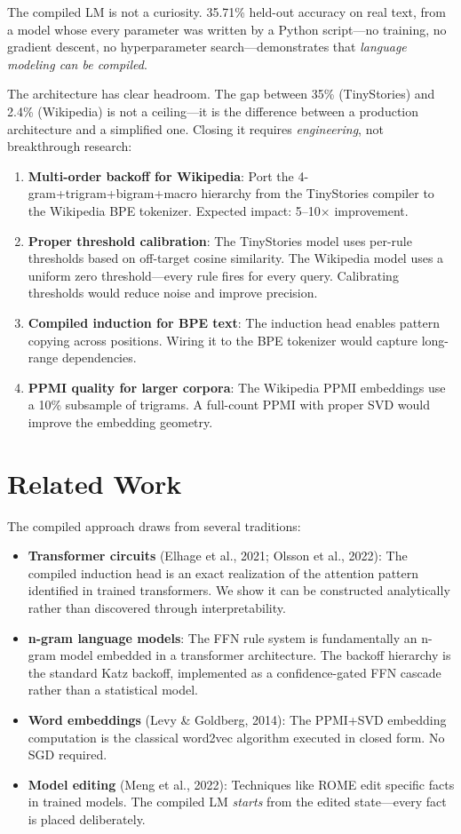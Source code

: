\documentclass[11pt,a4paper]{article}
\begin{document}
The compiled LM is not a curiosity. 35.71\% held-out accuracy on real text, from a model whose
every parameter was written by a Python script---no training, no gradient descent, no
hyperparameter search---demonstrates that \emph{language modeling can be compiled}.

The architecture has clear headroom. The gap between 35\% (TinyStories) and 2.4\% (Wikipedia) is
not a ceiling---it is the difference between a production architecture and a simplified one.
Closing it requires \emph{engineering}, not breakthrough research:

\begin{enumerate}[leftmargin=*]
\item \textbf{Multi-order backoff for Wikipedia}: Port the 4-gram+trigram+bigram+macro hierarchy from the TinyStories compiler to the Wikipedia BPE tokenizer. Expected impact: 5--10$\times$ improvement.
\item \textbf{Proper threshold calibration}: The TinyStories model uses per-rule thresholds based on off-target cosine similarity. The Wikipedia model uses a uniform zero threshold---every rule fires for every query. Calibrating thresholds would reduce noise and improve precision.
\item \textbf{Compiled induction for BPE text}: The induction head enables pattern copying across positions. Wiring it to the BPE tokenizer would capture long-range dependencies.
\item \textbf{PPMI quality for larger corpora}: The Wikipedia PPMI embeddings use a 10\% subsample of trigrams. A full-count PPMI with proper SVD would improve the embedding geometry.
\end{enumerate}

\section{Related Work}

The compiled approach draws from several traditions:

\begin{itemize}[leftmargin=*]
\item \textbf{Transformer circuits} (Elhage et al., 2021; Olsson et al., 2022): The compiled induction head is an exact realization of the attention pattern identified in trained transformers. We show it can be constructed analytically rather than discovered through interpretability.
\item \textbf{n-gram language models}: The FFN rule system is fundamentally an n-gram model embedded in a transformer architecture. The backoff hierarchy is the standard Katz backoff, implemented as a confidence-gated FFN cascade rather than a statistical model.
\item \textbf{Word embeddings} (Levy \& Goldberg, 2014): The PPMI+SVD embedding computation is the classical word2vec algorithm executed in closed form. No SGD required.
\item \textbf{Model editing} (Meng et al., 2022): Techniques like ROME edit specific facts in trained models. The compiled LM \emph{starts} from the edited state---every fact is placed deliberately.
\end{itemize}
\end{document}
